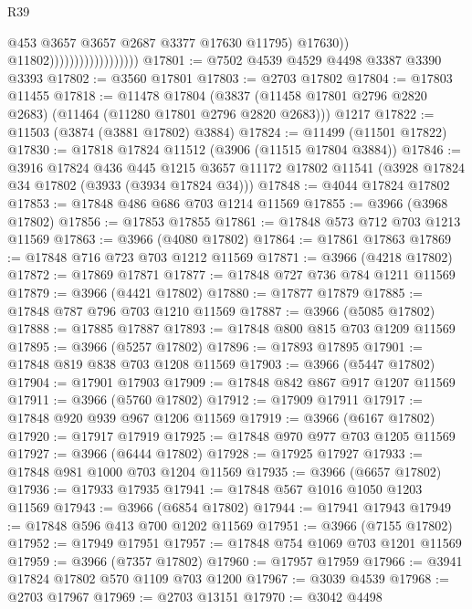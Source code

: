 \begin{lexlean}{R39}
\begin{coremodule}
                                              @453
                                              @3657
                                              @3657
                                              @2687
                                              @3377
                                              @17630
                                              @11795)
                                            @17630))
                                        @11802))))))))))))))))))
@17801 := @7502 @4539 @4529 @4498 @3387 @3390 @3393
@17802 := @3560 @17801
@17803 := @2703 @17802
@17804 := @17803 @11455
@17818 := @11478
    @17804
    (@3837 (@11458 @17801 @2796 @2820 @2683) (@11464 (@11280 @17801 @2796 @2820 @2683)))
    @1217
@17822 := @11503 (@3874 (@3881 @17802) @3884)
@17824 := @11499 (@11501 @17822)
@17830 := @17818 @17824 @11512 (@3906 (@11515 @17804 @3884))
@17846 := @3916
    @17824
    @436
    @445
    @1215
    @3657
    @11172
    @17802
    @11541
    (@3928 @17824 @34 @17802 (@3933 (@3934 @17824 @34)))
@17848 := @4044 @17824 @17802
@17853 := @17848 @486 @686 @703 @1214 @11569
@17855 := @3966 (@3968 @17802)
@17856 := @17853 @17855
@17861 := @17848 @573 @712 @703 @1213 @11569
@17863 := @3966 (@4080 @17802)
@17864 := @17861 @17863
@17869 := @17848 @716 @723 @703 @1212 @11569
@17871 := @3966 (@4218 @17802)
@17872 := @17869 @17871
@17877 := @17848 @727 @736 @784 @1211 @11569
@17879 := @3966 (@4421 @17802)
@17880 := @17877 @17879
@17885 := @17848 @787 @796 @703 @1210 @11569
@17887 := @3966 (@5085 @17802)
@17888 := @17885 @17887
@17893 := @17848 @800 @815 @703 @1209 @11569
@17895 := @3966 (@5257 @17802)
@17896 := @17893 @17895
@17901 := @17848 @819 @838 @703 @1208 @11569
@17903 := @3966 (@5447 @17802)
@17904 := @17901 @17903
@17909 := @17848 @842 @867 @917 @1207 @11569
@17911 := @3966 (@5760 @17802)
@17912 := @17909 @17911
@17917 := @17848 @920 @939 @967 @1206 @11569
@17919 := @3966 (@6167 @17802)
@17920 := @17917 @17919
@17925 := @17848 @970 @977 @703 @1205 @11569
@17927 := @3966 (@6444 @17802)
@17928 := @17925 @17927
@17933 := @17848 @981 @1000 @703 @1204 @11569
@17935 := @3966 (@6657 @17802)
@17936 := @17933 @17935
@17941 := @17848 @567 @1016 @1050 @1203 @11569
@17943 := @3966 (@6854 @17802)
@17944 := @17941 @17943
@17949 := @17848 @596 @413 @700 @1202 @11569
@17951 := @3966 (@7155 @17802)
@17952 := @17949 @17951
@17957 := @17848 @754 @1069 @703 @1201 @11569
@17959 := @3966 (@7357 @17802)
@17960 := @17957 @17959
@17966 := @3941 @17824 @17802 @570 @1109 @703 @1200
@17967 := @3039 @4539
@17968 := @2703 @17967
@17969 := @2703 @13151
@17970 := @3042 @4498

\end{coremodule}
\end{lexlean}
